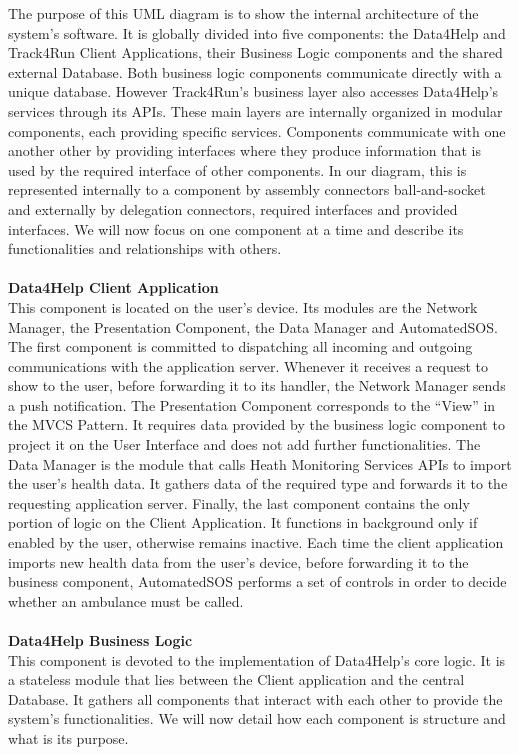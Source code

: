 \documentclass[titlepage]{article}
\begin{document}
The purpose of this UML diagram is to show the internal architecture of the system’s software. It is globally divided into five components: the Data4Help and Track4Run Client Applications, their Business Logic components and the shared external Database. Both business logic components communicate directly with a unique database. However Track4Run’s business layer also accesses Data4Help’s services through its APIs. These main layers are internally organized in modular components, each providing specific services. 
Components communicate with one another other by providing interfaces where they produce information that is used by the required interface of other components. In our diagram, this is represented internally to a component by assembly connectors ball-and-socket and externally by delegation connectors, required interfaces and provided interfaces.
We will now focus on one component at a time and describe its functionalities and relationships with others. \\ \\
{\bf Data4Help Client Application }\\
This component is located on the user’s device. Its modules are the Network Manager, the Presentation Component, the Data Manager and AutomatedSOS. 
The first component is committed to dispatching all incoming and outgoing communications with the application server. Whenever it receives a request to show to the user, before forwarding it to its handler, the Network Manager sends a push notification.
The Presentation Component corresponds to the “View” in the MVCS Pattern. It requires data provided by the business logic component to project it on the User Interface and does not add further functionalities. 
The Data Manager is the module that calls Heath Monitoring Services APIs to import the user’s health data. It gathers data of the required type and forwards it to the requesting application server.
Finally, the last component contains the only portion of logic on the Client Application. It functions in background only if enabled by the user, otherwise remains inactive. Each time the client application imports new health data from the user’s device, before forwarding it to the business component, AutomatedSOS performs a set of controls in order to decide whether an ambulance must be called. \\ \\
{\bf Data4Help Business Logic }\\ 
This component is devoted to the implementation of Data4Help’s core logic. It is a stateless module that lies between the Client application and the central Database. It gathers all components that interact with each other to provide the system’s functionalities. We will now detail how each component is structure and what is its purpose.
\end{document}

